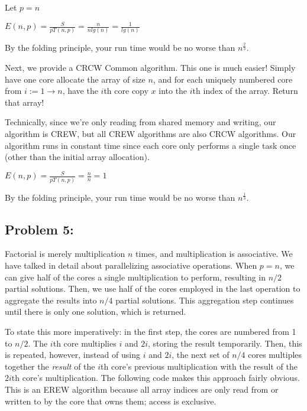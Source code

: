 \documentclass[12pt]{article}
\begin{document}
Let $p=n$

$E(n, p) = \frac{S}{pT(n, p)} = \frac{n}{nlg(n)} = \frac{1}{lg(n)}$

By the folding principle, your run time would be no worse than $n^{\frac{2}{3}}$.

Next, we provide a CRCW Common algorithm. This one is much easier! Simply have one core allocate the array of size $n$, and for each uniquely numbered core from $i := 1 \to n$, have the $i$th core copy $x$ into the $i$th index of the array. Return that array!

Technically, since we're only reading from shared memory and writing, our algorithm is CREW, but all CREW algorithms are also CRCW algorithms. Our algorithm runs in constant time since each core only performs a single task once (other than the initial array allocation).

$E(n, p) = \frac{S}{pT(n, p)} = \frac{n}{n} = 1$

By the folding principle, your run time would be no worse than $n^{\frac{1}{3}}$.

\subsection*{Problem 5: }

Factorial is merely multiplication $n$ times, and multiplication is associative. We have talked in detail about parallelizing associative operations. 
When $p=n$, we can give half of the cores a single multiplication to perform, resulting in $n/2$ partial solutions. Then, we use half of the cores employed in the last operation to aggregate the results into $n/4$ partial solutions. This aggregation step continues until there is only one solution, which is returned.

To state this more imperatively: in the first step, the cores are numbered from 1 to $n/2$. The $i$th core multiplies $i$ and $2i$, storing the result temporarily. Then, this is repeated, however, instead of using $i$ and $2i$, the next set of $n/4$ cores multiples together the \textit{result} of the $i$th core's previous multiplication with the result of the $2i$th core's multiplication. The following code makes this approach fairly obvious. This is an EREW algorithm because all array indices are only read from or written to by the core that owns them; access is exclusive.
\end{document}
